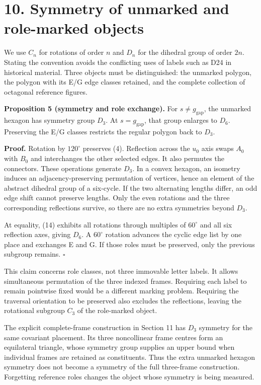 \documentclass[
  11pt,
  a4paper,
]{article}
\begin{document}
\section{10. Symmetry of unmarked and role-marked objects}\label{symmetry-of-unmarked-and-role-marked-objects}

We use \(C_n\) for rotations of order \(n\) and \(D_n\) for the dihedral group of order \(2n\). Stating the convention avoids the conflicting uses of labels such as D24 in historical material. Three objects must be distinguished: the unmarked polygon, the polygon with its E/G edge classes retained, and the complete collection of octagonal reference figures.

\textbf{Proposition 5 (symmetry and role exchange).} For \(s\ne g_{\mathrm{gap}}\), the unmarked hexagon has symmetry group \(D_3\). At \(s=g_{\mathrm{gap}}\), that group enlarges to \(D_6\). Preserving the E/G classes restricts the regular polygon back to \(D_3\).

\textbf{Proof.} Rotation by \(120^\circ\) preserves (4). Reflection across the \(u_0\) axis swaps \(A_0\) with \(B_0\) and interchanges the other selected edges. It also permutes the connectors. These operations generate \(D_3\). In a convex hexagon, an isometry induces an adjacency-preserving permutation of vertices, hence an element of the abstract dihedral group of a six-cycle. If the two alternating lengths differ, an odd edge shift cannot preserve lengths. Only the even rotations and the three corresponding reflections survive, so there are no extra symmetries beyond \(D_3\).

At equality, (14) exhibits all rotations through multiples of \(60^\circ\) and all six reflection axes, giving \(D_6\). A \(60^\circ\) rotation advances the cyclic edge list by one place and exchanges E and G. If those roles must be preserved, only the previous subgroup remains. \(\square\)

This claim concerns role classes, not three immovable letter labels. It allows simultaneous permutation of the three indexed frames. Requiring each label to remain pointwise fixed would be a different marking problem. Requiring the traversal orientation to be preserved also excludes the reflections, leaving the rotational subgroup \(C_3\) of the role-marked object.

The explicit complete-frame construction in Section 11 has \(D_3\) symmetry for the same covariant placement. Its three noncollinear frame centres form an equilateral triangle, whose symmetry group supplies an upper bound when individual frames are retained as constituents. Thus the extra unmarked hexagon symmetry does not become a symmetry of the full three-frame construction. Forgetting reference roles changes the object whose symmetry is being measured.
\end{document}
